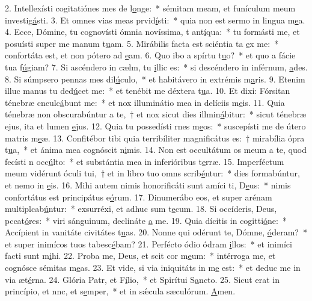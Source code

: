 2. Intellexísti cogitatiónes mes de l\uline{o}nge:~* sémitam meam, et funículum meum investig\uline{á}sti.
3. Et omnes vias meas prvid\uline{í}sti:~* quia non est sermo in lingua m\uline{e}a.
4. Ecce, Dómine, tu cognovísti ómnia novíssima, t ant\uline{í}qua:~* tu formásti me, et posuísti super me manum t\uline{u}am.
5. Mirábilis facta est sciéntia ta \uline{e}x me:~* confortáta est, et non pótero ad \uline{e}am.
6. Quo ibo a spírtu t\uline{u}o?~* et quo a fácie tua f\uline{ú}giam?
7. Si ascéndero in cælm, tu \uline{i}llic es:~* si descéndero in inférnum, \uline{a}des.
8. Si súmpsero pennas mes dil\uline{ú}culo,~* et habitávero in extrémis m\uline{a}ris.
9. Etenim illuc manus tu ded\uline{ú}cet me:~* et tenébit me déxtera t\uline{u}a.
10. Et dixi: Fórsitan ténebræ cnculc\uline{á}bunt me:~* et nox illuminátio mea in delíciis m\uline{e}is.
11. Quia ténebræ non obscurabúntur a te,~† et nox sicut dies illmin\uline{á}bitur:~* sicut ténebræ ejus, ita et lumen \uline{e}jus.
12. Quia tu possedísti rnes m\uline{e}os:~* suscepísti me de útero matris m\uline{e}æ.
13. Confitébor tibi quia terribíliter magnificátus es:~† mirabília ópra t\uline{u}a,~* et ánima mea cognóscit n\uline{i}mis.
14. Non est occultátum os meum a te, quod fecísti n occ\uline{ú}lto:~* et substántia mea in inferióribus t\uline{e}rræ.
15. Imperféctum meum vidérunt óculi tui,~† et in libro tuo omns scrib\uline{é}ntur:~* dies formabúntur, et nemo in \uline{e}is.
16. Mihi autem nimis honorificáti sunt amíci ti, D\uline{e}us:~* nimis confortátus est principátus e\uline{ó}rum.
17. Dinumerábo eos, et super arénam multiplcab\uline{ú}ntur:~* exsurréxi, et adhuc sum t\uline{e}cum.
18. Si occíderis, Deus, pccat\uline{ó}res:~* viri sánguinum, declináte \uline{a} me.
19. Quia dícitis in cogitti\uline{ó}ne:~* Accípient in vanitáte civitátes t\uline{u}as.
20. Nonne qui odérunt te, Dómne, \uline{ó}deram?~* et super inimícos tuos tabesc\uline{é}bam?
21. Perfécto ódio ódram \uline{i}llos:~* et inimíci facti sunt m\uline{i}hi.
22. Proba me, Deus, et scit cor m\uline{e}um:~* intérroga me, et cognósce sémitas m\uline{e}as.
23. Et vide, si via iniquitáts in m\uline{e} est:~* et deduc me in via æt\uline{é}rna.
24. Glória Patr, et F\uline{í}lio,~* et Spirítui S\uline{a}ncto.
25. Sicut erat in princípio, et nnc, et s\uline{e}mper,~* et in sǽcula sæculórum. \uline{A}men.

